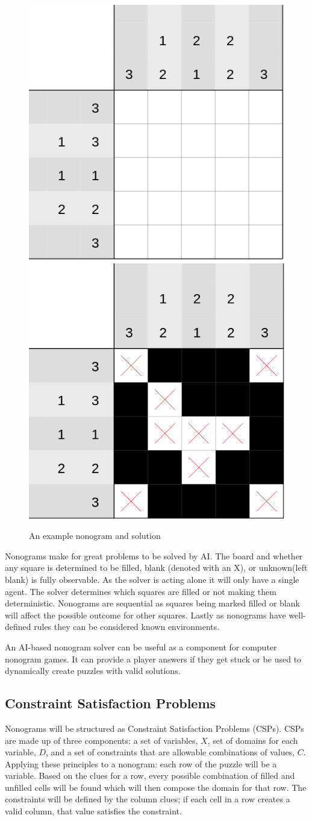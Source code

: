 \documentclass[12pt, letterpaper]
{article}
\begin{document}
\begin{figure}[H]
    \centering
    {\includegraphics[width=0.4\linewidth]{fig/nonogram.png}}\hfill
    {\includegraphics[width=0.4\linewidth]{fig/canvas.png}}
        \caption{An example nonogram and solution}
    \label{fig:example-nono}
\end{figure}

    Nonograms make for great problems to be solved by AI. The board and whether any square is determined to be filled, blank (denoted with an X), or unknown(left blank) is fully observable. As the solver is acting alone it will only have a single agent. The solver determines which squares are filled or not making them deterministic. Nonograms are sequential as squares being marked filled or blank will affect the possible outcome for other squares. Lastly as nonograms have well-defined rules they can be considered known environments. 
    
    An AI-based nonogram solver can be useful as a component for computer nonogram games. It can provide a player answers if they get stuck or be used to dynamically create puzzles with valid solutions.

    \subsection{Constraint Satisfaction Problems}
    Nonograms will be structured as Constraint Satisfaction Problems (CSPs). CSPs are made up of three components: a set of variables, $X$, set of domains for each variable, $D$, and a set of constraints that are allowable combinations of values, $C$. Applying these principles to a nonogram: each row of the puzzle will be a variable. Based on the clues for a row, every possible combination of filled and unfilled cells will be found which will then compose the domain for that row. The constraints will be defined by the column clues; if each cell in a row creates a valid column, that value satisfies the constraint.
\end{document}
